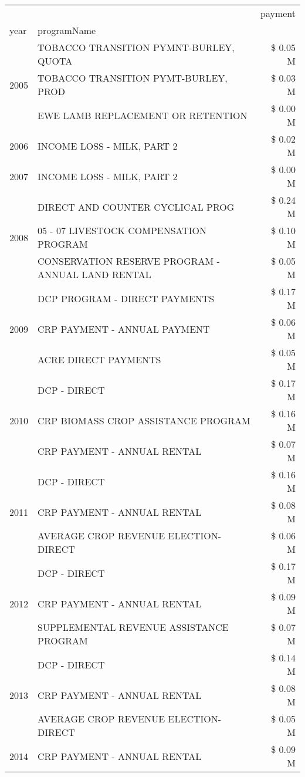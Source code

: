\begin{tabular}{llr}
\toprule
 &  & payment \\
year & programName &  \\
\midrule
\multirow[t]{3}{*}{2005} & TOBACCO TRANSITION PYMNT-BURLEY, QUOTA & \$ 0.05 M \\
 & TOBACCO TRANSITION PYMT-BURLEY, PROD & \$ 0.03 M \\
 & EWE LAMB REPLACEMENT OR RETENTION & \$ 0.00 M \\
\cline{1-3}
2006 & INCOME LOSS - MILK, PART 2 & \$ 0.02 M \\
\cline{1-3}
2007 & INCOME LOSS - MILK, PART 2 & \$ 0.00 M \\
\cline{1-3}
\multirow[t]{3}{*}{2008} & DIRECT AND COUNTER CYCLICAL PROG & \$ 0.24 M \\
 & 05 - 07 LIVESTOCK COMPENSATION PROGRAM & \$ 0.10 M \\
 & CONSERVATION RESERVE PROGRAM - ANNUAL LAND RENTAL & \$ 0.05 M \\
\cline{1-3}
\multirow[t]{3}{*}{2009} & DCP PROGRAM - DIRECT PAYMENTS & \$ 0.17 M \\
 & CRP PAYMENT - ANNUAL PAYMENT & \$ 0.06 M \\
 & ACRE DIRECT PAYMENTS & \$ 0.05 M \\
\cline{1-3}
\multirow[t]{3}{*}{2010} & DCP - DIRECT & \$ 0.17 M \\
 & CRP BIOMASS CROP ASSISTANCE PROGRAM & \$ 0.16 M \\
 & CRP PAYMENT - ANNUAL RENTAL & \$ 0.07 M \\
\cline{1-3}
\multirow[t]{3}{*}{2011} & DCP - DIRECT & \$ 0.16 M \\
 & CRP PAYMENT - ANNUAL RENTAL & \$ 0.08 M \\
 & AVERAGE CROP REVENUE ELECTION-DIRECT & \$ 0.06 M \\
\cline{1-3}
\multirow[t]{3}{*}{2012} & DCP - DIRECT & \$ 0.17 M \\
 & CRP PAYMENT - ANNUAL RENTAL & \$ 0.09 M \\
 & SUPPLEMENTAL REVENUE ASSISTANCE PROGRAM & \$ 0.07 M \\
\cline{1-3}
\multirow[t]{3}{*}{2013} & DCP - DIRECT & \$ 0.14 M \\
 & CRP PAYMENT - ANNUAL RENTAL & \$ 0.08 M \\
 & AVERAGE CROP REVENUE ELECTION-DIRECT & \$ 0.05 M \\
\cline{1-3}
\multirow[t]{3}{*}{2014} & CRP PAYMENT - ANNUAL RENTAL & \$ 0.09 M \\

\end{tabular}
